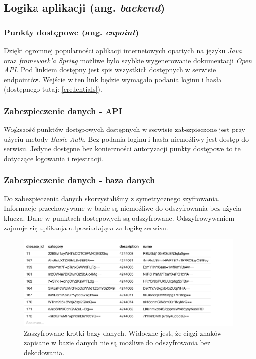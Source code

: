 \subsection{Logika aplikacji (ang. \textit{backend})}

\subsubsection{Punkty dostępowe (ang. \textit{enpoint})}
Dzięki ogromnej popularności aplikacji internetowych opartych na języku \textit{Java} oraz \textit{framework'a Spring} możliwe było szybkie wygenerowanie dokumentacji \textit{Open API}. Pod \href{https://trunk-kartapacjentaservice.herokuapp.com/swagger-ui.html} {linkiem} dostępny jest spis wszystkich dostępnych w serwisie endpointów. Wejście w ten link będzie wymagało podania loginu i hasła (dostępnego tutaj: \ref{credentials}).



\subsubsection{Zabezpieczenie danych - API}
Większość punktów dostępowych dostępnych w serwisie zabezpieczone jest przy użyciu metody \textit{Basic Auth}. Bez podania loginu i hasła niemożliwy jest dostęp do serwisu. Jedyne dostępne bez konieczności autoryzacji punkty dostępowe to te dotyczące logowania i rejestracji.

\subsubsection{Zabezpieczenie danych - baza danych}
Do zabezpieczenia danych skorzystaliśmy z symetrycznego szyfrowania. Informacje przechowywane w bazie są niemożliwe do odszyfrowania bez użycia klucza. Dane w punktach dostępowych są odszyfrowane. Odszyfrowywaniem zajmuje się aplikacja odpowiadająca za logikę serwisu.

\begin{figure}[H]
\centering
\includegraphics[width=15cm]{pictures/bd-encr}
\caption{Zaszyfrowane krotki bazy danych. Widoczne jest, że ciągi znaków zapisane w bazie danych nie są możliwe do odszyfrowania bez dekodowania.}
\end{figure}

